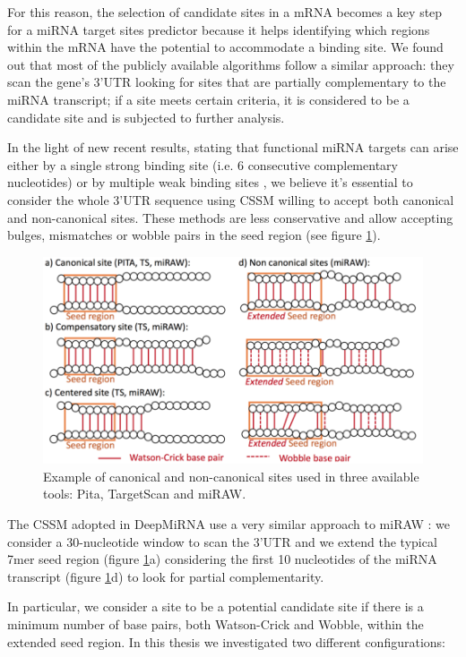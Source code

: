 For this reason, the selection of candidate sites in a mRNA becomes a key step for a miRNA target sites predictor because it helps identifying which regions within the mRNA have the potential to accommodate a binding site. We found out that most of the publicly available algorithms follow a similar approach: they scan the gene's 3'UTR  looking for sites that are partially complementary to the miRNA transcript; if a site meets certain criteria, it is considered to be a candidate site and is subjected to further analysis.

In the light of new recent results, stating that functional miRNA targets can arise either by a single strong binding site (i.e. 6 consecutive complementary nucleotides) or by multiple weak binding sites \cite{helwak}, we believe it's essential to consider the whole 3'UTR sequence using CSSM willing to accept both canonical and non-canonical sites. These methods are less conservative and allow accepting bulges, mismatches or wobble pairs in the seed region (see figure \ref{fig:canonical}).

\begin{figure}[hbt!]
	\centering
	\includegraphics[width=1\textwidth]{Figures/canonical}
	\caption{Example of canonical and non-canonical sites used in three available tools: Pita, TargetScan and miRAW.}
	\label{fig:canonical}
\end{figure}

The CSSM adopted in DeepMiRNA use a very similar approach to miRAW \cite{miraw}: we consider a 30-nucleotide window to scan the 3'UTR and we extend the typical 7mer seed region (figure \ref{fig:canonical}a) considering the first 10 nucleotides of the miRNA transcript (figure \ref{fig:canonical}d) to look for partial complementarity.

In particular, we consider a site to be a potential candidate site if there is a minimum number of base pairs, both Watson-Crick and Wobble, within the extended seed region. In this thesis we investigated two different configurations: 

